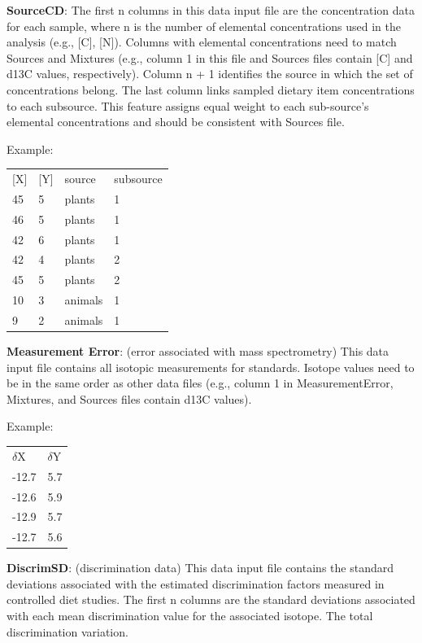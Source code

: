 \documentclass{article}
\begin{document}
\textbf{SourceCD}: The first n columns in this data input file are the concentration data for each sample, where n is the number of elemental concentrations used in the analysis (e.g., [C], [N]). Columns with elemental concentrations need to match Sources and Mixtures (e.g., column 1 in this file and Sources files contain [C] and d13C values, respectively). Column n + 1 identifies the source in which the set of concentrations belong. The last column links sampled dietary item concentrations to each subsource. This feature assigns equal weight to each sub-source’s elemental concentrations and should be consistent with Sources file.

Example:
\begin{center}
\begin{tabular}{llll}
[X] & [Y] & source & subsource\\
45 & 5 & plants & 1\\
46 & 5 & plants & 1\\
42 & 6 & plants & 1\\
42 & 4 & plants & 2\\
45 & 5 & plants & 2\\
10 & 3 & animals & 1\\
9 & 2 & animals & 1\\
\end{tabular}
\end{center}


\textbf{Measurement Error}: (error associated with mass spectrometry) This data input file contains all isotopic measurements for standards. Isotope values need to be in the same order as other data files (e.g., column 1 in MeasurementError, Mixtures, and Sources files contain d13C values). 

Example:
\begin{center}
\begin{tabular}{ll}
$\delta$X & $\delta$Y \\
-12.7 & 5.7\\
-12.6 & 5.9\\
-12.9 & 5.7\\
-12.7 & 5.6\\
\end{tabular}
\end{center}

\textbf{DiscrimSD}: (discrimination data) This data input file contains the standard deviations associated with the estimated discrimination factors measured in controlled diet studies. The first n columns are the standard deviations associated with each mean discrimination value for the associated isotope. The total discrimination variation.
\end{document}
